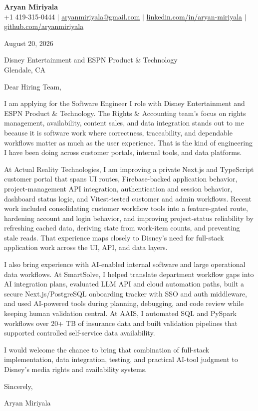 \documentclass[letterpaper,11pt]{article}
\begin{document}
\begin{center}
  {\LARGE \textbf{Aryan Miriyala}}\\[-1pt]
  \small
  +1 419-315-0444 $|$
  \href{mailto:aryanmiriyala@gmail.com}{aryanmiriyala@gmail.com} $|$
  \href{https://www.linkedin.com/in/aryan-miriyala-7788a21b6/}{linkedin.com/in/aryan-miriyala} $|$
  \href{https://github.com/aryanmiriyala}{github.com/aryanmiriyala}
\end{center}

August 20, 2026

Disney Entertainment and ESPN Product \& Technology\\
Glendale, CA

Dear Hiring Team,

I am applying for the Software Engineer I role with Disney Entertainment and ESPN Product \& Technology. The Rights \& Accounting team's focus on rights management, availability, content sales, and data integration stands out to me because it is software work where correctness, traceability, and dependable workflows matter as much as the user experience. That is the kind of engineering I have been doing across customer portals, internal tools, and data platforms.

At Actual Reality Technologies, I am improving a private Next.js and TypeScript customer portal that spans UI routes, Firebase-backed application behavior, project-management API integration, authentication and session behavior, dashboard status logic, and Vitest-tested customer and admin workflows. Recent work included consolidating customer workflow tools into a feature-gated route, hardening account and login behavior, and improving project-status reliability by refreshing cached data, deriving state from work-item counts, and preventing stale reads. That experience maps closely to Disney's need for full-stack application work across the UI, API, and data layers.

I also bring experience with AI-enabled internal software and large operational data workflows. At SmartSolve, I helped translate department workflow gaps into AI integration plans, evaluated LLM API and cloud automation paths, built a secure Next.js/PostgreSQL onboarding tracker with SSO and auth middleware, and used AI-powered tools during planning, debugging, and code review while keeping human validation central. At AAIS, I automated SQL and PySpark workflows over 20+ TB of insurance data and built validation pipelines that supported controlled self-service data availability.

I would welcome the chance to bring that combination of full-stack implementation, data integration, testing, and practical AI-tool judgment to Disney's media rights and availability systems.

Sincerely,

Aryan Miriyala
\end{document}
